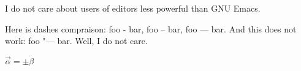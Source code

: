 \documentclass{article}
\begin{document}

I do not care about users of editors
less powerful than GNU Emacs.

Here is dashes compraison: foo - bar, foo -- bar, foo --- bar.
And this does not work: foo "--- bar. Well, I do not care.


$ \vec α = ±\dot β$
\end{document}
